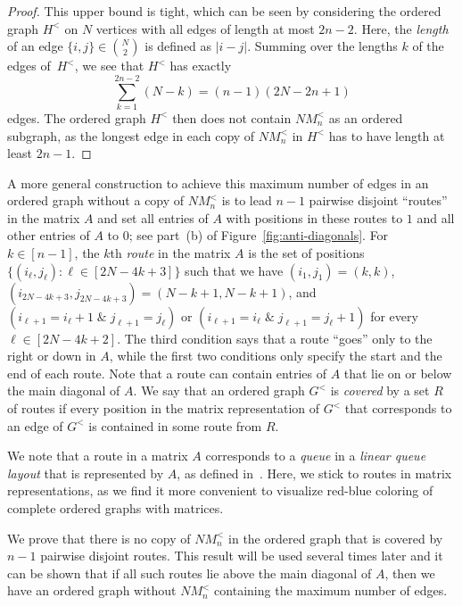 \documentclass[11pt,a4paper]{article}
\theoremstyle{remark}
\begin{document}
\begin{proof}
This upper bound is tight, which can be seen by considering the ordered graph $H^<$ on $N$ vertices with all edges of length at most $2n-2$.
Here, the \emph{length} of an edge $\{i,j\} \in \binom{N}{2}$ is defined as $|i-j|$.
Summing over the lengths $k$ of the edges of~$H^<$, we see that $H^<$ has exactly
$$\sum_{k=1}^{2n-2} (N-k) = (n-1)(2N-2n+1)$$
edges. The ordered graph $H^<$ then does not contain $NM^<_n$ as an ordered subgraph, as the longest edge in each copy of $NM^<_n$ in $H^<$ has to have length at least $2n-1$.
\end{proof}

A more general construction to achieve this maximum number of edges in an ordered graph without a copy of $NM^<_n$ is to lead $n-1$ pairwise disjoint ``routes'' in the matrix $A$ and set all entries of $A$ with positions in these routes to $1$ and all other entries of $A$ to $0$; see part~(b) of Figure~\ref{fig:anti-diagonals}.
For $k \in [n-1]$, the $k$th \emph{route} in the matrix $A$ is the set of positions $\{(i_\ell,j_\ell) \colon \ell \in [2N-4k+3]\}$ such that we have $(i_1,j_1) = (k,k)$, $(i_{2N-4k+3},j_{2N-4k+3}) = (N-k+1,N-k+1)$, and $(i_{\ell+1} = i_\ell+1 \; \& \; j_{\ell+1} = j_\ell)$ or $(i_{\ell+1} = i_\ell \; \& \; j_{\ell+1} = j_\ell+1)$ for every $\ell \in [2N-4k+2]$.
The third condition says that a route ``goes'' only to the right or down in $A$, while the first two conditions only specify the start and the end of each route.
Note that a route can contain entries of $A$ that lie on or below the main diagonal of $A$.
We say that an ordered graph $G^<$ is \emph{covered} by a set $R$ of routes if every position in the matrix representation of $G^<$ that corresponds to an edge of $G^<$ is contained in some route from $R$.

We note that a route in a matrix $A$ corresponds to a \emph{queue} in a \emph{linear queue layout} that is represented by $A$, as defined in~\cite{dujWoo10}.
Here, we stick to routes in matrix representations, as we find it more convenient to visualize red-blue coloring of complete ordered graphs with matrices.

We prove that there is no copy of $NM^<_n$ in the ordered graph that is covered by $n-1$ pairwise disjoint routes.
This result will be used several times later and it can be shown that if all such routes lie above the main diagonal of $A$, then we have an ordered graph without $NM^<_n$ containing the maximum number of edges.
\end{document}
